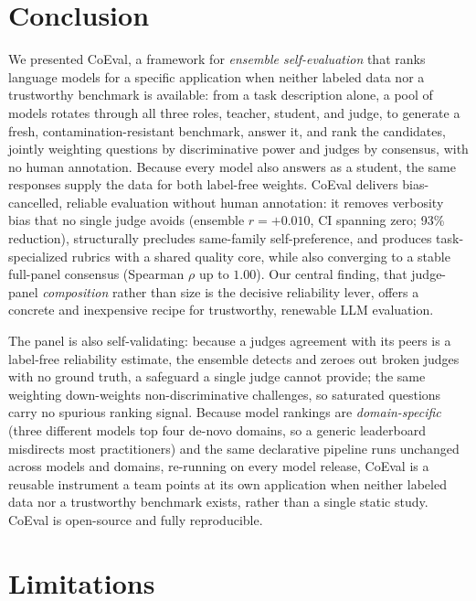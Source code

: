 \section{Conclusion}\label{conclusion}

We presented CoEval, a framework for \emph{ensemble self-evaluation} that ranks language models for a specific application when neither labeled data nor a trustworthy benchmark is available: from a task description alone, a pool of models rotates through all three roles, teacher, student, and judge, to generate a fresh, contamination-resistant benchmark, answer it, and rank the candidates, jointly weighting questions by discriminative power and judges by consensus, with no human annotation. Because every model also answers as a student, the same responses supply the data for both label-free weights. CoEval delivers
bias-cancelled, reliable evaluation without human annotation: it removes verbosity bias that no single judge avoids
(ensemble \(r = +0.010\), CI spanning zero; 93\% reduction), structurally precludes same-family self-preference, and
produces task-specialized rubrics with a shared quality core, while also converging
to a stable full-panel consensus (Spearman \(\rho\) up to \(1.00\)). Our
central finding, that judge-panel \emph{composition} rather than size is the decisive reliability lever, offers a
concrete and inexpensive recipe for trustworthy, renewable LLM evaluation.

The panel is also self-validating: because a
judge\textquotesingle s agreement with its peers is a label-free reliability estimate, the ensemble detects and zeroes out broken judges
with no ground truth, a safeguard a single judge cannot provide; the same weighting down-weights non-discriminative
challenges, so saturated questions carry no spurious ranking signal. Because model rankings are
\emph{domain-specific} (three different models top four de-novo domains, so a generic leaderboard misdirects most
practitioners) and the same declarative pipeline runs unchanged across models and domains, re-running on
every model release, CoEval is a reusable instrument a team points at its own application when neither labeled data nor
a trustworthy benchmark exists, rather than a single static study. CoEval is open-source and fully reproducible.

\section*{Limitations}\label{limitations}

